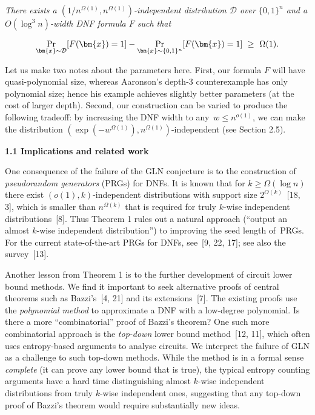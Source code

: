 \documentclass[10pt,a4paper]{article}
\begin{document}
\emph{There exists a $(1/n^{\Omega(1)},n^{\Omega(1)})$-independent distribution $\mathcal{D}$ over $\{0,1\}^{n}$ and a $O(\log^{3}n)$-width DNF formula $F$ such that}\par


\[\begin{gathered}
\Pr_{\bm{x}\sim\mathcal{D}}[F(\bm{x})=1]-\Pr_{\bm{x}\sim\{0,1\}^{n}}[F(\bm{x})=1]\nobreak\ \geq\nobreak\ \Omega(1).
\end{gathered}\]







Let us make two notes about the parameters here.
First, our formula $F$ will have quasi-polynomial size, whereas Aaronson’s depth-3 counterexample has only polynomial size; hence his example achieves slightly better parameters (at the cost of larger depth). Second, our construction can be varied to produce the following tradeoff: by increasing the DNF width to any $w\leq n^{o(1)}$, we can make the distribution $(\exp(-w^{\Omega(1)}),n^{\Omega(1)})$-independent (see Section 2.5).\par




\par\medskip\noindent\textbf{
1.1 Implications and related work}\par




One consequence of the failure of the GLN conjecture is to the construction of \emph{pseudorandom generators} (PRGs) for DNFs. It is known that for $k\geq\Omega(\log n)$ there exist $(o(1),k)$-independent distributions with support size $2^{O(k)}$ [18, 3], which is smaller than $n^{\Omega(k)}$ that is required for truly $k$-wise independent distributions [8]. Thus Theorem 1 rules out a natural approach (“output an almost $k$-wise independent distribution”) to improving the seed length of PRGs. For the current state-of-the-art PRGs for DNFs, see [9, 22, 17]; see also the survey [13].\par




Another lesson from Theorem 1 is to the further development of circuit lower bound methods. We find it important to seek alternative proofs of central theorems such as Bazzi’s [4, 21] and its extensions [7]. The existing proofs use the \emph{polynomial method} to approximate a DNF with a low-degree polynomial. Is there a more “combinatorial” proof of Bazzi’s theorem? One such more combinatorial approach is the \emph{top-down} lower bound method [12, 11], which often uses entropy-based arguments to analyse circuits. We interpret the failure of GLN as a challenge to such top-down methods. While the method is in a formal sense \emph{complete} (it can prove any lower bound that is true), the typical entropy counting arguments have a hard time distinguishing almost $k$-wise independent distributions from truly $k$-wise independent ones, suggesting that any top-down proof of Bazzi’s theorem would require substantially new ideas.\par
\end{document}
